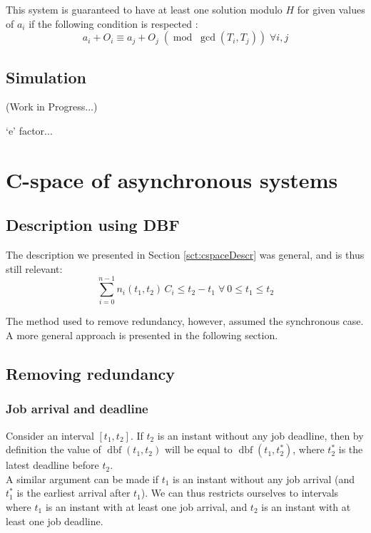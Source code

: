 \documentclass[times, 10pt,twocolumn, a4paper]{article}
\newcommand{\dbf}[1]{\operatorname{dbf}(#1)}
\begin{document}
		This system is guaranteed to have at least one solution modulo $H$ for given
		values of $a_i$ if the following condition is respected :
		\[
			a_i + O_i \equiv a_j + O_j \; (\operatorname{mod} \; \operatorname{gcd}(T_i,
			T_j)) \; \forall i,j
		\]

  \subsection{Simulation}

  (Work in Progress...)

  `e' factor...

\section{C-space of asynchronous systems}
  \label{sct:asyncCspace}

  \subsection{Description using DBF}

  The description we presented in Section \ref{sct:cspaceDescr} was general, and is thus still relevant: $$\sum_{i=0}^{n-1} n_i(t_1, t_2) \, C_i \leq t_2 - t_1 \; \forall \: 0 \leq t_1 \leq t_2$$

  The method used to remove redundancy, however, assumed the synchronous case. A more general approach is presented in the following section.

  \subsection{Removing redundancy}

\subsubsection{Job arrival and deadline}

Consider an interval $[t_1, t_2]$. If $t_2$ is an instant without any job deadline, then by definition the value of $\dbf{t_1, t_2}$ will be equal to $\dbf{t_1, t_2^*}$, where $t_2^*$ is the latest deadline before $t_2$.\\

A similar argument can be made if $t_1$ is an instant without any job arrival (and $t_1^*$ is the earliest arrival after $t_1$). We can thus restricts ourselves to intervals where $t_1$ is an instant with at least one job arrival, and $t_2$ is an instant with at least one job deadline.
\end{document}
